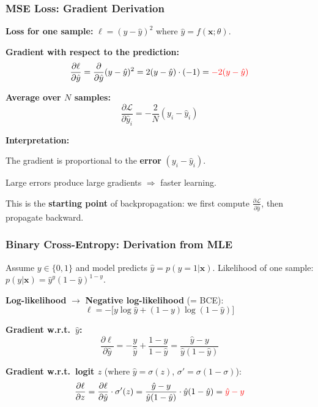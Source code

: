 \documentclass[notes,11pt, aspectratio=169]{beamer}
\newenvironment{wideitemize}{\itemize\addtolength{\itemsep}{10pt}}{\enditemize}
\newcommand{\vx}{\mathbf{x}}
\newcommand{\pd}[2]{\frac{\partial #1}{\partial #2}}
\begin{document}
\begin{frame}
\frametitle{MSE Loss: Gradient Derivation}

\textbf{Loss for one sample:} $\ell = (y - \hat{y})^2$ where $\hat{y} = f(\vx; \theta)$.

\vspace{6pt}
\textbf{Gradient with respect to the prediction:}
\[
    \pd{\ell}{\hat{y}} = \pd{}{\hat{y}}(y - \hat{y})^2 = 2(y - \hat{y}) \cdot (-1) = \textcolor{red}{-2(y - \hat{y})}
\]

\vspace{4pt}
\textbf{Average over $N$ samples:}
\[
    \pd{\mathcal{L}}{\hat{y}_i} = -\frac{2}{N}(y_i - \hat{y}_i)
\]

\vspace{6pt}
\textbf{Interpretation:}
\begin{wideitemize}
    \item The gradient is proportional to the \textbf{error} $(y_i - \hat{y}_i)$.
    \item Large errors produce large gradients $\Rightarrow$ faster learning.
    \item This is the \textbf{starting point} of backpropagation: we first compute $\pd{\mathcal{L}}{\hat{y}}$, then propagate backward.
\end{wideitemize}
\end{frame}

\begin{frame}
\frametitle{Binary Cross-Entropy: Derivation from MLE}

Assume $y \in \{0, 1\}$ and model predicts $\hat{y} = p(y=1|\vx)$. Likelihood of one sample:
$p(y | \vx) = \hat{y}^{y}(1 - \hat{y})^{1-y}$.

\vspace{2pt}
\textbf{Log-likelihood} $\to$ \textbf{Negative log-likelihood} (= BCE):
\[
    \ell = -\big[y \log \hat{y} + (1-y) \log(1 - \hat{y})\big]
\]

\textbf{Gradient w.r.t.\ $\hat{y}$:}
\[
    \pd{\ell}{\hat{y}} = -\frac{y}{\hat{y}} + \frac{1-y}{1-\hat{y}} = \frac{\hat{y} - y}{\hat{y}(1-\hat{y})}
\]

\textbf{Gradient w.r.t.\ logit $z$} (where $\hat{y} = \sigma(z)$, $\sigma' = \sigma(1-\sigma)$):
\[
    \pd{\ell}{z} = \pd{\ell}{\hat{y}} \cdot \sigma'(z) = \frac{\hat{y} - y}{\hat{y}(1-\hat{y})} \cdot \hat{y}(1-\hat{y}) = \textcolor{red}{\hat{y} - y}
\]
\end{frame}
\end{document}
